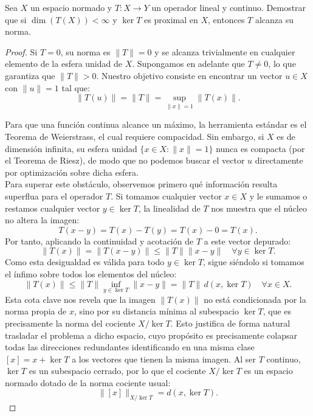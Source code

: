 \documentclass[12pt]{article}
\begin{document}
    \begin{ejercicio}
        Sea $X$ un espacio normado y $T:X\to Y$ un operador lineal y continuo. Demostrar que si $\dim(T(X)) < \infty$ y $\ker T$ es proximal en $X$, entonces $T$ alcanza su norma.

        \begin{proof}
            Si $T = 0$, su norma es $\|T\| = 0$ y se alcanza trivialmente en cualquier elemento de la esfera unidad de $X$. Supongamos en adelante que $T \neq 0$, lo que garantiza que $\|T\| > 0$. Nuestro objetivo consiste en encontrar un vector $u \in X$ con $\|u\| = 1$ tal que:
            \begin{equation*}
                \|T(u)\| = \|T\| = \sup_{\|x\| = 1} \|T(x)\| .
            \end{equation*}

            Para que una función continua alcance un máximo, la herramienta estándar es el Teorema de Weierstrass, el cual requiere compacidad. Sin embargo, si $X$ es de dimensión infinita, su esfera unidad $\{x \in X : \|x\| = 1\}$ nunca es compacta (por el Teorema de Riesz), de modo que no podemos buscar el vector $u$ directamente por optimización sobre dicha esfera.\\

            Para superar este obstáculo, observemos primero qué información resulta superflua para el operador $T$. Si tomamos cualquier vector $x \in X$ y le sumamos o restamos cualquier vector $y \in \ker T$, la linealidad de $T$ nos muestra que el núcleo no altera la imagen:
            \begin{equation*}
                T(x - y) = T(x) - T(y) = T(x) - 0 = T(x) .
            \end{equation*}
            Por tanto, aplicando la continuidad y acotación de $T$ a este vector depurado:
            \begin{equation*}
                \|T(x)\| = \|T(x - y)\| \leq \|T\| \|x - y\| \quad \forall y \in \ker T .
            \end{equation*}
            Como esta desigualdad es válida para todo $y \in \ker T$, sigue siéndolo si tomamos el ínfimo sobre todos los elementos del núcleo:
            \begin{equation*}
                \|T(x)\| \leq \|T\| \inf_{y \in \ker T} \|x - y\| = \|T\| \, d(x, \ker T) \quad \forall x \in X .
            \end{equation*}
            Esta cota clave nos revela que la imagen $\|T(x)\|$ no está condicionada por la norma propia de $x$, sino por su distancia mínima al subespacio $\ker T$, que es precisamente la norma del cociente $X/\ker T$. Esto justifica de forma natural trasladar el problema a dicho espacio, cuyo propósito es precisamente colapsar todas las direcciones redundantes identificando en una misma clase $[x] = x + \ker T$ a los vectores que tienen la misma imagen. Al ser $T$ continuo, $\ker T$ es un subespacio cerrado, por lo que el cociente $X/\ker T$ es un espacio normado dotado de la norma cociente usual:
            \begin{equation*}
                \|[x]\|_{X/\ker T} = d(x, \ker T).
            \end{equation*}


\end{proof}
\end{ejercicio}
\end{document}
